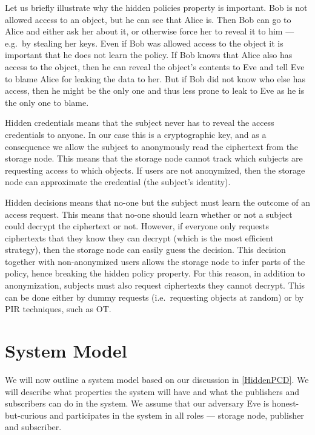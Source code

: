 Let us briefly illustrate why the hidden policies property is important.
Bob is not allowed access to an object, but he can see that Alice is.
Then Bob can go to Alice and either ask her about it, or otherwise force her to 
reveal it to him --- e.g.\ by stealing her keys.
Even if Bob was allowed access to the object it is important that he does not 
learn the policy.
If Bob knows that Alice also has access to the object, then he can reveal the 
object's contents to Eve and tell Eve to blame Alice for leaking the data to 
her.
But if Bob did not know who else has access, then he might be the only one and 
thus less prone to leak to Eve as he is the only one to blame.

Hidden credentials means that the subject never has to reveal the access 
credentials to anyone.
In our case this is a cryptographic key, and as a consequence we allow the 
subject to anonymously read the ciphertext from the storage node.
This means that the storage node cannot track which subjects are requesting 
access to which objects.
If users are not anonymized, then the storage node can approximate the 
credential (the subject's identity).

Hidden decisions means that no-one but the subject must learn the outcome of an 
access request.
This means that no-one should learn whether or not a subject could decrypt the 
ciphertext or not.
However, if everyone only requests ciphertexts that they know they can decrypt 
(which is the most efficient strategy), then the storage node can easily guess 
the decision.
This decision together with non-anonymized users allows the storage node to 
infer parts of the policy, hence breaking the hidden policy property.
For this reason, in addition to anonymization, subjects must also request 
ciphertexts they cannot decrypt.
This can be done either by dummy requests (i.e.\ requesting objects at random) 
or by \ac{PIR} techniques, such as \ac{OT}.


\section{System Model}\label{SystemModel}

We will now outline a system model based on our discussion in \cref{HiddenPCD}.
We will describe what properties the system will have and what the publishers 
and subscribers can do in the system.
We assume that our adversary Eve is honest-but-curious and participates in the 
system in all roles --- storage node, publisher and subscriber.

